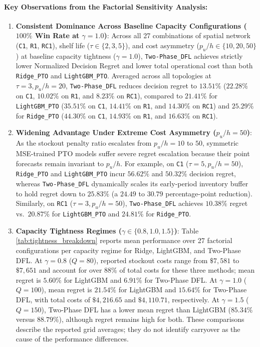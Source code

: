 \documentclass[11pt,a4paper]{article}
\theoremstyle{definition}
\theoremstyle{remark}
\begin{document}
\paragraph{Key Observations from the Factorial Sensitivity Analysis:}
\begin{enumerate}[label=(\roman*)]
    \item \textbf{Consistent Dominance Across Baseline Capacity Configurations ($100\%$ Win Rate at $\gamma = 1.0$)}: Across all 27 combinations of spatial network (\texttt{C1}, \texttt{R1}, \texttt{RC1}), shelf life ($\tau \in \{2, 3, 5\}$), and cost asymmetry ($p_u/h \in \{10, 20, 50\}$) at baseline capacity tightness ($\gamma = 1.0$), \texttt{Two-Phase\_DFL} achieves strictly lower Normalized Decision Regret and lower total operational cost than both \texttt{Ridge\_PTO} and \texttt{LightGBM\_PTO}. Averaged across all topologies at $\tau = 3, p_u/h = 20$, \texttt{Two-Phase\_DFL} reduces decision regret to $13.51\%$ ($22.28\%$ on \texttt{C1}, $10.02\%$ on \texttt{R1}, and $8.23\%$ on \texttt{RC1}), compared to $21.41\%$ for \texttt{LightGBM\_PTO} ($35.51\%$ on \texttt{C1}, $14.41\%$ on \texttt{R1}, and $14.30\%$ on \texttt{RC1}) and $25.29\%$ for \texttt{Ridge\_PTO} ($44.30\%$ on \texttt{C1}, $14.93\%$ on \texttt{R1}, and $16.63\%$ on \texttt{RC1}).
    \item \textbf{Widening Advantage Under Extreme Cost Asymmetry ($p_u/h = 50$)}: As the stockout penalty ratio escalates from $p_u/h = 10$ to $50$, symmetric MSE-trained PTO models suffer severe regret escalation because their point forecasts remain invariant to $p_u/h$. For example, on \texttt{C1} ($\tau = 5, p_u/h = 50$), \texttt{Ridge\_PTO} and \texttt{LightGBM\_PTO} incur $56.62\%$ and $50.32\%$ decision regret, whereas \texttt{Two-Phase\_DFL} dynamically scales its early-period inventory buffer to hold regret down to $25.83\%$ (a $24.49$ to $30.79$ percentage-point reduction). Similarly, on \texttt{RC1} ($\tau = 3, p_u/h = 50$), \texttt{Two-Phase\_DFL} achieves $10.38\%$ regret vs.\ $20.87\%$ for \texttt{LightGBM\_PTO} and $24.81\%$ for \texttt{Ridge\_PTO}.
    \item \textbf{Capacity Tightness Regimes ($\gamma \in \{0.8, 1.0, 1.5\}$)}: Table \ref{tab:tightness_breakdown} reports mean performance over 27 factorial configurations per capacity regime for Ridge, LightGBM, and Two-Phase DFL. At $\gamma=0.8$ ($Q=80$), reported stockout costs range from $\$7,581$ to $\$7,651$ and account for over $88\%$ of total costs for these three methods; mean regret is $5.60\%$ for LightGBM and $6.91\%$ for Two-Phase DFL. At $\gamma=1.0$ ($Q=100$), mean regret is $21.54\%$ for LightGBM and $15.64\%$ for Two-Phase DFL, with total costs of $\$4,216.65$ and $\$4,110.71$, respectively. At $\gamma=1.5$ ($Q=150$), Two-Phase DFL has a lower mean regret than LightGBM ($85.34\%$ versus $88.79\%$), although regret remains high for both. These comparisons describe the reported grid averages; they do not identify carryover as the cause of the performance differences.

\end{enumerate}
\end{document}
